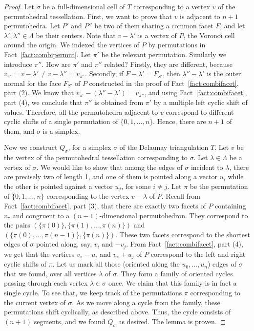 \documentclass[12pt,a4paper,oneside]{amsart}
\theoremstyle{definition}
\theoremstyle{remark}
\numberwithin{equation}{section}
\begin{document}
\begin{proof}
Let $\sigma$ be a full-dimensional cell of $T$ corresponding to a vertex $v$ of the permutohedral tessellation. First, we want to prove that $v$ is adjacent to $n+1$ permutohedra. Let $P'$ and $P''$ be two of them sharing a common facet $F$, and let $\lambda', \lambda'' \in \Lambda$ be their centers. Note that $v - \lambda'$ is a vertex of $P$, the Vorono\u{\i} cell around the origin. We indexed the vertices of $P$ by permutations in Fact~\ref{fact:combipermut}. Let $\pi'$ be the relevant permutation. Similarly we introduce $\pi''$. How are $\pi'$ and $\pi''$ related? Firstly, they are different, because $v_{\pi'} = v - \lambda' \neq v - \lambda'' = v_{\pi''}$. Secondly, if $F - \lambda' = F_{S'}$, then $\lambda''-\lambda'$ is the outer normal for the face $F_{S'}$ of $P$ constructed in the proof of Fact~\ref{fact:combifacet}, part (2). We know that $v_{\pi'} - (\lambda''-\lambda') = v_{\pi''}$, and using Fact~\ref{fact:combifacet}, part (4), we conclude that $\pi''$ is obtained from $\pi'$ by a multiple left cyclic shift of values. Therefore, all the permutohedra adjacent to $v$ correspond to different cyclic shifts of a single permutation of $\{0,1,\ldots,n\}$. Hence, there are $n+1$ of them, and $\sigma$ is a simplex.

Now we construct $Q_\sigma$, for a simplex $\sigma$ of the Delaunay triangulation $T$. Let $v$ be the vertex of the permutohedral tessellation corresponding to $\sigma$. Let $\lambda \in \Lambda$ be a vertex of $\sigma$. We would like to show that among the edges of $\sigma$ incident to $\lambda$, there are precisely two of length 1, and one of them is pointed along a vector $u_i$ while the other is pointed against a vector $u_j$, for some $i\neq j$. Let $\pi$ be the permutation of $\{0,1,\ldots,n\}$ corresponding to the vertex $v - \lambda$ of $P$. Recall from Fact~\ref{fact:combifacet}, part (3), that there are exactly two facets of $P$ containing $v_\pi$ and congruent to a $(n-1)$-dimensional permutohedron. They correspond to the pairs $(\{\pi(0)\}, \{\pi(1), \ldots, \pi(n)\})$ and $(\{\pi(0), \ldots, \pi(n-1)\}, \{\pi(n)\})$. These two facets correspond to the shortest edges of $\sigma$ pointed along, say, $v_i$ and $-v_j$. From Fact~\ref{fact:combifacet}, part (4), we get that the vertices $v_\pi - u_i$ and $v_\pi + u_j$ of $P$ correspond to the left and right cyclic shifts of $\pi$. Let us mark all those (oriented along the $u_0, \ldots, u_n$) edges of $\sigma$ that we found, over all vertices $\lambda$ of $\sigma$. They form a family of oriented cycles passing through each vertex $\lambda \in \sigma$ once. We claim that this family is in fact a single cycle. To see that, we keep track of the permutations $\pi$ corresponding to the current vertex of $\sigma$. As we move along a cycle from the family, these permutations shift cyclically, as described above. Thus, the cycle consists of $(n+1)$ segments, and we found $Q_\sigma$ as desired. The lemma is proven.
\end{proof}
\end{document}
